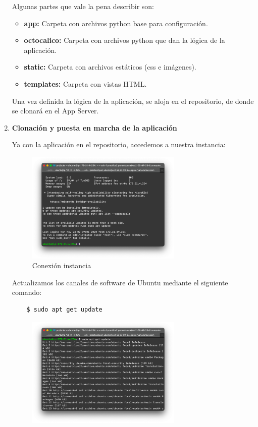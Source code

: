 \documentclass{article}
\begin{document}
\begin{enumerate}
    Algunas partes que vale la pena describir son:
    \begin{itemize}
        \item {\bf app:} Carpeta con archivos python base para configuración.
        \item {\bf octocalico:} Carpeta con archivos python que dan la lógica
        de la aplicación.
        \item {\bf static:} Carpeta con archivos estáticos (css e imágenes).
        \item {\bf templates:} Carpeta con vistas HTML.
    \end{itemize}

    Una vez definida la lógica de la aplicación, se aloja en el repositorio, de
    donde se clonará en el App Server.

    \item {\bf Clonación y puesta en marcha de la aplicación}

    Ya con la aplicación en el repositorio, accedemos a nuestra instancia:
    \begin{figure}[H]
      \centering
      \includegraphics[width=0.70\textwidth]{AppServer/i1}
      \caption{Conexión instancia}
    \end{figure}

    Actualizamos los canales de software de Ubuntu mediante el siguiente
    comando:
    \begin{lstlisting}
    $ sudo apt get update
    \end{lstlisting}
    \begin{figure}[H]
      \centering
      \includegraphics[width=0.70\textwidth]{AppServer/i2}
    \end{figure}


\end{enumerate}
\end{document}

